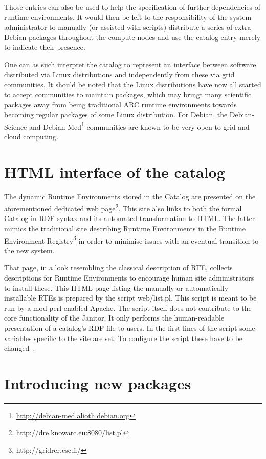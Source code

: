 Those entries can also be used to help the specification of further
dependencies of runtime environments. It would then be left to the
responsibility of the system administrator to manually (or assisted with
scripts) distribute a series of extra Debian packages throughout the
compute nodes and use the catalog entry merely to indicate their presence.

One can as such interpret the catalog to represent an interface between
software distributed via Linux distributions and independently from these
via grid communities. It should be noted that the Linux distributions
have now all started to accept communities to maintain packages, which
may bringt many scientific packages away from being traditional ARC 
runtime environments towards becoming regular packages of some Linux
distribution. For Debian, the Debian-Science and
Debian-Med\footnote{\href{http://debian-med.alioth.debian.org}{http://debian-med.alioth.debian.org}}
communities are known to be very open to grid and cloud computing.

\section{HTML interface of the catalog}

The dynamic Runtime Environments stored in the
Catalog are presented on the aforementioned dedicated web
page\footnote{http://dre.knowarc.eu:8080/list.pl}. This site also
links to both the formal Catalog in RDF syntax and its automated
transformation to HTML. The latter mimics the traditional
site describing Runtime Environments in the Runtime Environment
Registry\footnote{http://gridrer.csc.fi/} in order to minimise issues
with an eventual transition to the new system.

That page, in a look resembling the classical description of RTE,
collects descriptions for Runtime Environments to encourage human site
administrators to install these.  This HTML page listing the manually or
automatically installable RTEs is prepared by the script web/list.pl.
This script is meant to be run by a mod-perl enabled Apache. The
script itself does not contribute to the core functionality of the
Janitor. It only performs the human-readable presentation of a catalog's
RDF file to users. In the first lines of the script some variables
specific to the site are set. To configure the script these have to be
changed~\cite[p. 9]{BAYER_2007}.

\section{Introducing new packages}\label{sec:catalog}\label{sec:introducing_new_packages}

